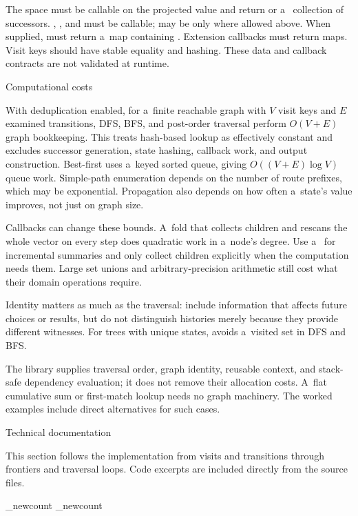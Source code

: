 {The space must be callable on the projected value and return  or a~
collection of successors. , , and
 must be callable;  may be  only
where allowed above. When supplied,  must return a~map
containing . Extension callbacks must return maps. Visit keys
should have stable equality and hashing. These data and callback contracts
are not validated at runtime.

\secc Computational costs

With deduplication enabled, for a~finite reachable graph with $V$ visit keys
and $E$ examined transitions, DFS, BFS, and post-order traversal perform $O(V+E)$ graph
bookkeeping. This treats hash-based lookup as effectively constant and
excludes successor generation, state hashing, callback work, and output
construction. Best-first uses a~keyed sorted queue, giving
$O((V+E)\log V)$ queue work. Simple-path enumeration depends on the number
of route prefixes, which may be exponential. Propagation also depends on
how often a~state's value improves, not just on graph size.

Callbacks can change these bounds. A~fold that collects children and
rescans the whole vector on every step does quadratic work in a~node's degree.
Use a~ for incremental summaries and only collect children
explicitly when the computation needs them.
Large set unions and arbitrary-precision arithmetic still cost what their
domain operations require.

Identity matters as much as the traversal: include information that affects
future choices or results, but do not distinguish histories merely because
they provide different witnesses. For trees with unique states,
 avoids a~visited set in DFS and BFS.

The library supplies traversal order, graph identity, reusable context, and
stack-safe dependency evaluation; it does not remove their allocation
costs. A~flat cumulative sum or first-match lookup needs no graph machinery.
The worked examples include direct alternatives for such cases.

\sec Technical documentation

This section follows the implementation from visits and transitions through
frontiers and traversal loops. Code excerpts are included directly from the
source files.

\_newcount\sourcefirstline
\_newcount\sourcelastline
{}}

